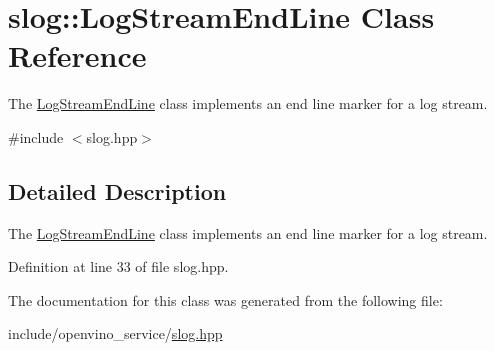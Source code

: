 \hypertarget{classslog_1_1LogStreamEndLine}{}\section{slog\+:\+:Log\+Stream\+End\+Line Class Reference}
\label{classslog_1_1LogStreamEndLine}


The \hyperlink{classslog_1_1LogStreamEndLine}{Log\+Stream\+End\+Line} class implements an end line marker for a log stream.  




{\ttfamily \#include $<$slog.\+hpp$>$}



\subsection{Detailed Description}
The \hyperlink{classslog_1_1LogStreamEndLine}{Log\+Stream\+End\+Line} class implements an end line marker for a log stream. 

Definition at line 33 of file slog.\+hpp.



The documentation for this class was generated from the following file\+:\begin{DoxyCompactItemize}
\item 
include/openvino\+\_\+service/\hyperlink{slog_8hpp}{slog.\+hpp}\end{DoxyCompactItemize}
